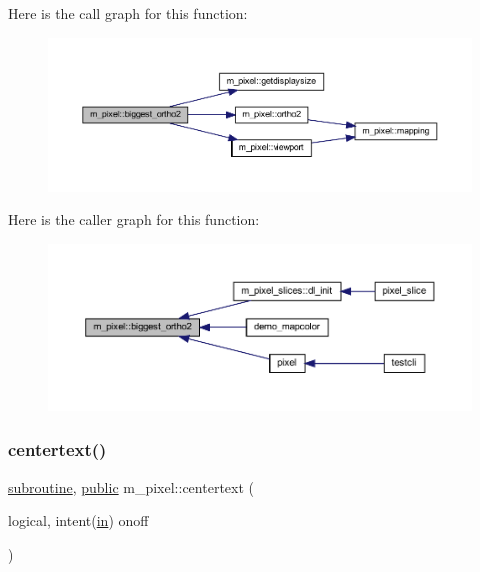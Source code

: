 Here is the call graph for this function\+:
\nopagebreak
\begin{figure}[H]
\begin{center}
\leavevmode
\includegraphics[width=350pt]{namespacem__pixel_accc2eab6fbc7b453afa34e1e2c834223_cgraph}
\end{center}
\end{figure}
Here is the caller graph for this function\+:
\nopagebreak
\begin{figure}[H]
\begin{center}
\leavevmode
\includegraphics[width=350pt]{namespacem__pixel_accc2eab6fbc7b453afa34e1e2c834223_icgraph}
\end{center}
\end{figure}
\mbox{\label{namespacem__pixel_a9ddc8e8604bbc3181c728f08a6b87904}} 
\subsubsection{\texorpdfstring{centertext()}{centertext()}}
{\footnotesize\ttfamily \hyperlink{M__stopwatch_83_8txt_acfbcff50169d691ff02d4a123ed70482}{subroutine}, \hyperlink{M__stopwatch_83_8txt_a2f74811300c361e53b430611a7d1769f}{public} m\+\_\+pixel\+::centertext (\begin{DoxyParamCaption}\item[{logical, intent(\hyperlink{M__journal_83_8txt_afce72651d1eed785a2132bee863b2f38}{in})}]{onoff }\end{DoxyParamCaption})}



